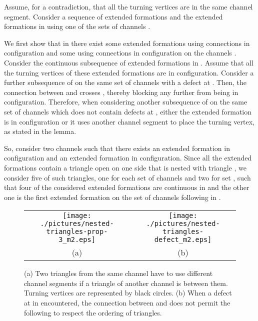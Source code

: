 \documentclass[a4paper,10pt]{llncs}
\newcounter{prop}
\renewenvironment{proof}
{{\bf Proof:}}{\hspace*{\fill}\par\vspace{2mm}}
\begin{document}
\begin{proof}
Assume, for a contradiction, that all the turning vertices are in the same channel segment. Consider a sequence of extended formations  and the extended formations in  using one of the sets of channels .

We first show that in  there exist some extended formations using connections in  configuration and some using connections in  configuration on the channels . Consider the continuous subsequence of extended formations   in . Assume that all the turning vertices of these extended formations are in  configuration. Consider a further subsequence of  on the same set of channels with a defect at . Then, the connection between  and  crosses , thereby blocking any further  from being in  configuration. Therefore, when considering another subsequence of  on the same set of channels which does not contain defects at , either the extended formation  is in  configuration or it uses another channel segment to place the turning vertex, as stated in the lemma.

So, consider two channels  such that there exists an extended formation  in  configuration and an extended formation  in  configuration. Since all the extended formations contain a triangle open on one side that is nested with triangle , we consider five of such triangles, one for each set of channels  and two for set , such that four of the considered extended formations   are continuous in  and the other one  is the first extended formation on the set of channels  following  in .

\begin{figure}[ht]
\begin{center}
\begin{tabular}{c c}
\mbox{\texttt{[image: ./pictures/nested-triangles-prop-3\_m2.eps]}} \hspace{0.1cm} &
\mbox{\texttt{[image: ./pictures/nested-triangles-defect\_m2.eps]}} \\
(a) & (b)\\
\end{tabular}
\caption{(a) Two triangles from the same channel have to use different channel segments if a triangle of another channel is between them. Turning vertices are represented by black circles. (b) When a defect at  in encountered, the connection between  and  does not permit the following  to respect the ordering of triangles.}
\label{fig:nested-triangles-prop-3}
\end{center}
\end{figure}


\end{proof}
\end{document}
